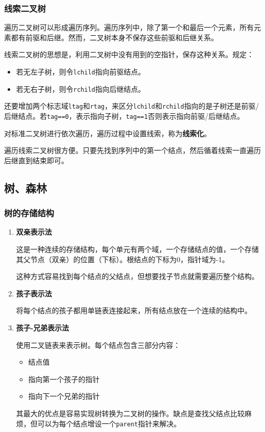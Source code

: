 \documentclass[12pt, a4paper, oneside]{ctexart}
\begin{document}
\subsubsection{线索二叉树}

遍历二叉树可以形成遍历序列。遍历序列中，除了第一个和最后一个元素，所有元素都有前驱和后继。然而，二叉树本身不保存这些前驱和后继关系。

线索二叉树的思想是，利用二叉树中没有用到的空指针，保存这种关系。规定：
\begin{itemize}
  \item 若无左子树，则令\verb|lchild|指向前驱结点。
  \item 若无右子树，则令\verb|rchild|指向后继结点。
\end{itemize}

还要增加两个标志域\verb|ltag|和\verb|rtag|，来区分\verb|lchild|和\verb|rchild|指向的是子树还是前驱/后继结点。若\verb|tag==0|，表示指向子树，\verb|tag==1|否则表示指向前驱/后继结点。

对标准二叉树进行依次遍历，遍历过程中设置线索，称为\textbf{线索化}。

遍历线索二叉树很方便。只要先找到序列中的第一个结点，然后循着线索一直遍历后继直到结束即可。

\subsection{树、森林}

\subsubsection{树的存储结构}

\begin{enumerate}
  \item {\bf 双亲表示法}
  
  这是一种连续的存储结构，每个单元有两个域，一个存储结点的值，一个存储其父节点（双亲）的位置（下标）。根结点的下标为0，指针域为-1。

  这种方式容易找到每个结点的父结点，但想要找子节点就需要遍历整个结构。

  \item {\bf 孩子表示法}
  
  将每个结点的孩子都用单链表连接起来，所有结点放在一个连续的结构中。

  \item {\bf 孩子-兄弟表示法}
  
  使用二叉链表来表示树。每个结点包含三部分内容：
  \begin{itemize}
    \item 结点值
    \item 指向第一个孩子的指针
    \item 指向下一个兄弟的指针
  \end{itemize}

  其最大的优点是容易实现树转换为二叉树的操作。缺点是查找父结点比较麻烦，但可以为每个结点增设一个\verb|parent|指针来解决。
\end{enumerate}
\end{document}
